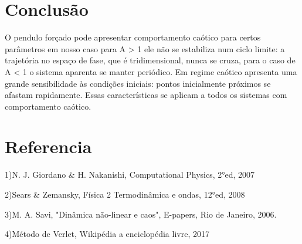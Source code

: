 \documentclass[dvipsnames,a4paper,11pt]{article}
\begin{document}
\section{Conclus\~ao}

O pendulo forçado pode apresentar comportamento caótico para certos parâmetros em nosso caso para A > 1 ele não se estabiliza num ciclo limite: a trajetória no espaço de fase, que é tridimensional, nunca se cruza, para o caso de A < 1 o sistema aparenta se manter periódico. 
Em regime caótico apresenta uma grande sensibilidade às condições iniciais: pontos inicialmente próximos se afastam rapidamente. Essas características se aplicam a todos os sistemas com comportamento caótico.

\section{Referencia}

\noindent 

1)N. J. Giordano \& H. Nakanishi, Computational Physics, 2°ed, 2007

2)Sears \& Zemansky, F\'isica 2 Termodinâmica e ondas, 12°ed, 2008

3)M. A. Savi, "Din\^amica n\~ao-linear e caos", E-papers, Rio de Janeiro, 2006.

4)M\'etodo de Verlet, Wikip\'edia a enciclop\'edia livre, 2017
\end{document}
